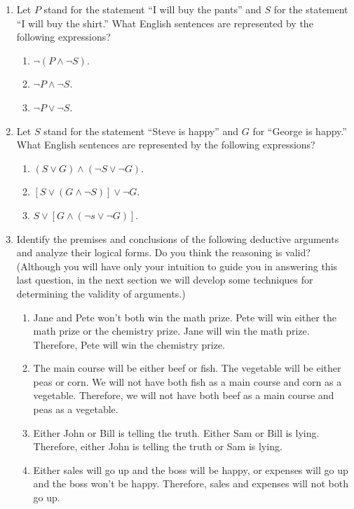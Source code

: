 \begin{enumerate}
\begin{enumerate}
  \item $P \land \neg P$.
  \item $(P \land Q)(P \lor R)$.
  \end{enumerate}
\item Let $P$ stand for the statement ``I will buy the pants'' and $S$ for the statement ``I will buy the shirt.'' What English sentences are represented by the following expressions?
  \begin{enumerate}
  \item $\neg(P \land \neg S)$.
  \item $\neg P \land \neg S$.
  \item $\neg P \lor \neg S$.
  \end{enumerate}
\item Let $S$ stand for the statement ``Steve is happy'' and $G$ for ``George is happy.'' What English sentences are represented by the following expressions?
  \begin{enumerate}
  \item $(S \lor G) \land (\neg S \lor \neg G)$.
  \item $[S \lor (G \land \neg S)] \lor \neg G$.
  \item $S \lor [G \land (\neg s \lor \neg G)]$.
  \end{enumerate}
\item Identify the premises and conclusions of the following deductive arguments and analyze their logical forms. Do you think the reasoning is valid? (Although you will have only your intuition to guide you in answering this last question, in the next section we will develop some techniques for determining the validity of arguments.)
  \begin{enumerate}
  \item Jane and Pete won't both win the math prize. Pete will win either the math prize or the chemistry prize. Jane will win the math prize. Therefore, Pete will win the chemistry prize.
  \item The main course will be either beef or fish. The vegetable will be either peas or corn. We will not have both fish as a main course and corn as a vegetable. Therefore, we will not have both beef as a main course and peas as a vegetable.
  \item Either John or Bill is telling the truth. Either Sam or Bill is lying. Therefore, either John is telling the truth or Sam is lying.
  \item Either sales will go up and the boss will be happy, or expenses will go up and the boss won't be happy. Therefore, sales and expenses will not both go up.
  \end{enumerate}
\end{enumerate}
